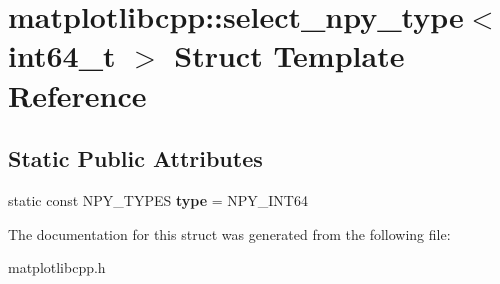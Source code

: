 \hypertarget{structmatplotlibcpp_1_1select__npy__type_3_01int64__t_01_4}{}\section{matplotlibcpp\+:\+:select\+\_\+npy\+\_\+type$<$ int64\+\_\+t $>$ Struct Template Reference}
\label{structmatplotlibcpp_1_1select__npy__type_3_01int64__t_01_4}
\subsection*{Static Public Attributes}
\begin{DoxyCompactItemize}
\item 
\mbox{\label{structmatplotlibcpp_1_1select__npy__type_3_01int64__t_01_4_a0d20ea35e520ad9381aca3c173f3f02d}} 
static const N\+P\+Y\+\_\+\+T\+Y\+P\+ES {\bfseries type} = N\+P\+Y\+\_\+\+I\+N\+T64
\end{DoxyCompactItemize}


The documentation for this struct was generated from the following file\+:\begin{DoxyCompactItemize}
\item 
matplotlibcpp.\+h\end{DoxyCompactItemize}
